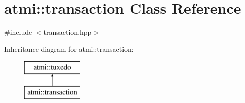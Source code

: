 \hypertarget{classatmi_1_1transaction}{}\section{atmi\+:\+:transaction Class Reference}
\label{classatmi_1_1transaction}


{\ttfamily \#include $<$transaction.\+hpp$>$}

Inheritance diagram for atmi\+:\+:transaction\+:\begin{figure}[H]
\begin{center}
\leavevmode
\includegraphics[height=2.000000cm]{classatmi_1_1transaction}
\end{center}
\end{figure}

